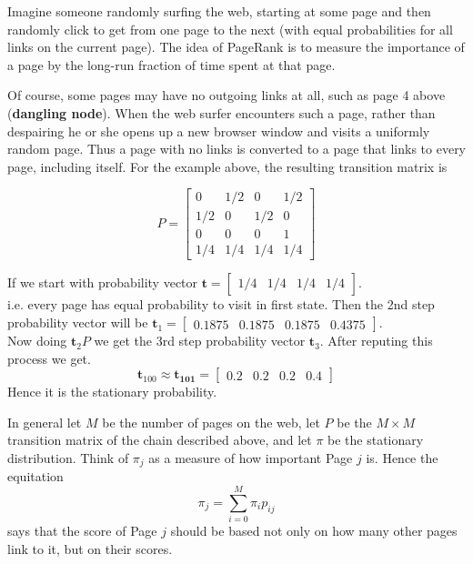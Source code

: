 Imagine someone randomly surfing the web, starting at some page and 
then randomly click to get from one page to the next (with equal probabilities for
all links on the current page).
 The idea of PageRank is to measure the importance
of a page by the long-run fraction of time spent at that page.

Of course, some pages may have no outgoing links at all, such as page 4 above (\textbf{dangling node}). When
the web surfer encounters such a page, rather than despairing he or she opens up a
new browser window and visits a uniformly random page. Thus a page with no links
is converted to a page that links to every page, including itself. For the example
above, the resulting transition matrix is

\[
    P =
    \begin{bmatrix}
        0 & 1/2 & 0 & 1/2 \\ 
        1/2 & 0 & 1/2 & 0 \\ 
        0 & 0 & 0 & 1 \\
        1/4 & 1/4 & 1/4 & 1/4
    \end{bmatrix} 
\]

If we start with probability vector 
$ \mathbf{t} = \begin{bmatrix}
    1/4 & 1/4 & 1/4 & 1/4 
\end{bmatrix}  $.\\ 
i.e. every page has equal probability to visit in first state. Then the 2nd step 
probability vector will be 
$\mathbf{t}_{1}= 
    \begin{bmatrix}
        0.1875 & 0.1875 & 0.1875 & 0.4375 
    \end{bmatrix} 
$.\\ 
Now doing $ \mathbf{t}_{2}P $ we get the 3rd step probability vector $ \mathbf{t}_{3} $.
After reputing this process we get.
\[
    \mathbf{t}_{100} \approx \mathbf{t_{101}} = \begin{bmatrix}
        0.2 & 0.2 & 0.2 & 0.4 
    \end{bmatrix} 
\]
Hence it is the stationary probability.

In general let $ M $ be the number of pages on the web, let  $ P $ be the  $ M\times M $
transition matrix of the chain described above, and 
let $ \pi $ be the stationary distribution.
Think of $ \pi_{j} $ as a measure of how important Page $j$ is. 
Hence the equitation 
\[
    \pi_{j}=\sum_{i=0}^{M} \pi_{i}p_{ij}
\]
says that the score of Page $j$ should be based not only on how many other pages link
to it, but on their scores.


